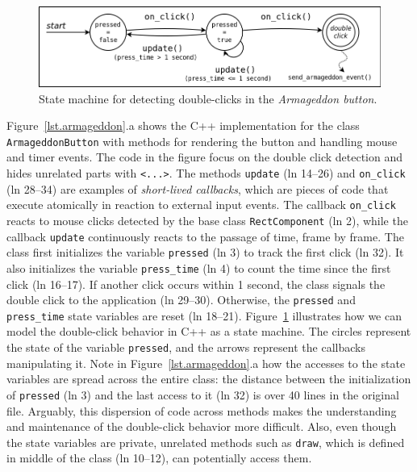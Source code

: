 \documentclass[times,twocolumn,final]{elsarticle}
\newcommand{\code}[1] {{\small{\texttt{#1}}}}
\begin{document}
\begin{figure}
\centering
\includegraphics[width=\columnwidth]{double-click}
\caption{State machine for detecting double-clicks in the
         \emph{Armageddon button}.
\label{fig.armageddon.fsm}
}
\end{figure}

Figure~\ref{lst.armageddon}.a shows the C++ implementation for the class
\code{ArmageddonButton} with methods for rendering the button and handling
mouse and timer events.
The code in the figure focus on the double click detection and hides unrelated
parts with \code{<...>}.
%
The methods \code{update} (ln 14--26) and \code{on\_click} (ln 28--34) are
examples of \emph{short-lived callbacks}, which are pieces of code that execute
atomically in reaction to external input events.
The callback \code{on\_click} reacts to mouse clicks detected by the base class
\code{RectComponent} (ln 2), while the callback \code{update} continuously
reacts to the passage of time, frame by frame.
%
The class first initializes the variable \code{pressed} (ln 3) to track the
first click (ln 32).
It also initializes the variable \code{press\_time} (ln 4) to count the time
since the first click (ln 16--17).
If another click occurs within 1 second, the class signals the double click to
the application (ln 29--30).
Otherwise, the \code{pressed} and \code{press\_time} state variables are reset
(ln 18--21).
%
Figure~\ref{fig.armageddon.fsm} illustrates how we can model the double-click 
behavior in C++ as a state machine.
The circles represent the state of the variable \code{pressed}, and the arrows 
represent the callbacks manipulating it.
%
Note in Figure~\ref{lst.armageddon}.a how the accesses to the state variables
are spread across the entire class: the distance between the initialization of
\code{pressed} (ln  3) and the last access to it (ln 32) is over 40 lines in
the original file.
Arguably, this dispersion of code across methods makes the understanding and 
maintenance of the double-click behavior more difficult.
Also, even though the state variables are private, unrelated methods such as 
\code{draw}, which is defined in middle of the class (ln 10--12), can
potentially access them.
\end{document}
